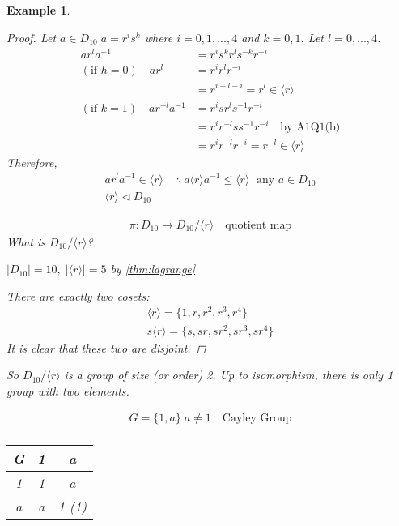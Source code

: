 \documentclass[11pt, oneside]{book}
\theoremstyle{break}
\newtheorem*{proof}{Proof}
\newtheorem{eg}{Example}[section]
\begin{document}
\begin{eg}
\begin{enumerate}
            \begin{proof}
                Let $a \in D_{10} \; a = r^i s^k$ where $i = 0, 1, ..., 4$ and $k = 0, 1$. Let $l = 0, ..., 4$.
                \begin{align*}
                    a r^l a^{-1} &= r^i s^k r^l s^{-k} r^{-i} \\
                    (\text{if } h = 0) \quad ar^l &= r^i r^l r^{-i} \\
                            &= r^{i - l - i} = r^l \in \langle r \rangle \\
                    (\text{if } k = 1) \quad ar^{-l}a^{-1} &= r^i sr^l s^{-1} r^{-i} \\
                        &= r^i r^{-l} ss^{-1} r^{-i} \quad \text{by A1Q1(b)} \\
                        &= r^ir^{-l}r^{-i} = r^{-l} \in \langle r \rangle
                \end{align*}
                Therefore,
                \begin{gather*}
                    ar^la^{-1} \in \langle r \rangle \quad \therefore \; a \langle r \rangle a^{-1} \leq \langle r \rangle \; \text{ any $a \in D_{10}$} \\
                    \langle r \rangle \triangleleft D_{10}
                \end{gather*}

                \begin{gather*}
                    \pi : D_{10} \to D_{10}/\langle r \rangle \quad \text{quotient map}
                \end{gather*}
                What is $D_{10}/\langle r \rangle$?

                $|D_{10}| = 10, \; |\langle r \rangle| = 5$ by \autoref{thm:lagrange}

                There are exactly two cosets:
                \begin{gather*}
                    \langle r \rangle = \{1, r, r^2, r^3, r^4 \} \\
                    s \langle r \rangle = \{s, sr, sr^2, sr^3, sr^4 \}
                \end{gather*}
                It is clear that these two are disjoint.
            \end{proof}

            So $D_{10} / \langle r \rangle$ is a group of size (or order) 2. Up to isomorphism, there is only 1 group with two elements.

            \begin{gather*}
                G = \{1, a\} \; a \neq 1 \quad \text{Cayley Group} \\
            \end{gather*}
            \begin{tabular}{c | c | c}
             G & 1 & a \\
             \hline
             1 & 1 & a \\
             \hline
             a & a & 1 (1)
            \end{tabular}


\end{enumerate}
\end{eg}
\end{document}
